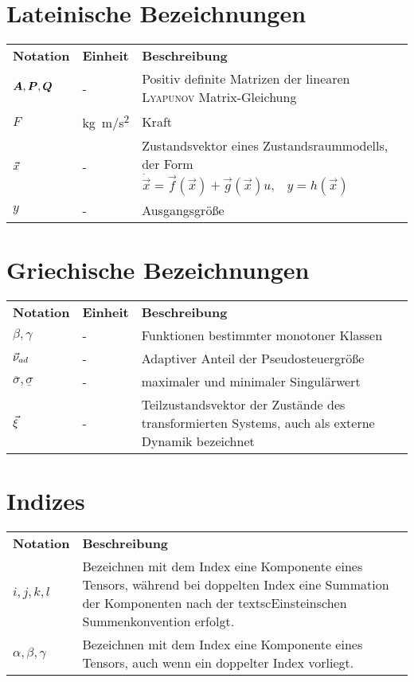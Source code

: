 \section*{Lateinische Bezeichnungen}
\begin{longtable}{lp{2.5cm}p{10.5cm}}
	\textbf{Notation} & \textbf{Einheit} & \textbf{Beschreibung}\\
	$\bm{A}, \bm{P}, \bm{Q}$ & - &
		Positiv definite Matrizen der linearen \textsc{Lyapunov}
		Matrix-Gleichung\\
	$F$ & \si{kg.m/s^2} & Kraft\\
	$\vec{x}$ & - &
		Zustandsvektor eines Zustandsraummodells, der Form
		\mbox{
		    $\dot{\vec{x}} = \vec{f}(\vec{x}) + \vec{g}(\vec{x}) u
		    \text{,}\quad
			y = h(\vec{x})$
		}\\
	$y$ & - & Ausgangsgröße
\end{longtable}
%
\section*{Griechische Bezeichnungen}
\begin{longtable}{lp{2.5cm}p{10.5cm}}
	\textbf{Notation} & \textbf{Einheit} & \textbf{Beschreibung}\\
	$\beta, \gamma$ & - & Funktionen bestimmter monotoner Klassen\\
	$\vec{\nu}_{ad}$ & - & Adaptiver Anteil der Pseudosteuergröße\\
	$\overline{\sigma}, \underline{\sigma}$ & - &
		maximaler und minimaler Singulärwert\\
	$\vec{\xi}$ & - & Teilzustandsvektor der Zustände des transformierten
		Systems, auch als externe Dynamik bezeichnet
\end{longtable}
%
\section*{Indizes}
\begin{longtable}{lp{13cm}}
	\textbf{Notation} & \textbf{Beschreibung}\\
	$i, j, k, l$ & Bezeichnen mit dem Index eine Komponente eines Tensors,
		während bei doppelten Index eine Summation der Komponenten nach
		der textsc{Einstein}schen Summenkonvention erfolgt.\\
    $\alpha , \beta , \gamma$ & Bezeichnen mit dem Index eine Komponente eines
    	Tensors, auch wenn ein doppelter Index vorliegt.
\end{longtable}
%
